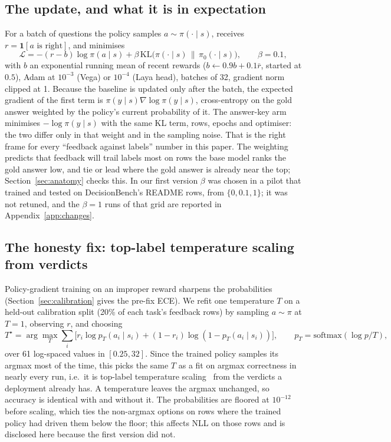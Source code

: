 \documentclass[11pt]{article}
\newcommand{\KL}{\mathrm{KL}}
\begin{document}
\subsection{The update, and what it is in expectation}
For a batch of questions the policy samples $a\sim\pi(\cdot\mid s)$, receives $r=\mathbf 1[a\text{ is right}]$, and minimises
\begin{equation}
\mathcal L = -(r-b)\log\pi(a\mid s) + \beta\,\KL\big(\pi(\cdot\mid s)\,\|\,\pi_0(\cdot\mid s)\big),\qquad \beta=0.1,
\label{eq:loss}
\end{equation}
with $b$ an exponential running mean of recent rewards ($b\leftarrow0.9b+0.1\bar r$, started at $0.5$), Adam at $10^{-3}$ (Vega) or $10^{-4}$ (Laya head), batches of 32, gradient norm clipped at 1. Because the baseline is updated only after the batch, the expected gradient of the first term is $\pi(y\mid s)\nabla\log\pi(y\mid s)$, cross-entropy on the gold answer weighted by the policy's current probability of it. The answer-key arm minimises $-\log\pi(y\mid s)$ with the same KL term, rows, epochs and optimiser: the two differ only in that weight and in the sampling noise. That is the right frame for every ``feedback against labels'' number in this paper. The weighting predicts that feedback will trail labels most on rows the base model ranks the gold answer low, and tie or lead where the gold answer is already near the top; Section~\ref{sec:anatomy} checks this. In our first version $\beta$ was chosen in a pilot that trained and tested on DecisionBench's README rows, from $\{0, 0.1, 1\}$; it was not retuned, and the $\beta=1$ runs of that grid are reported in Appendix~\ref{app:changes}.

\subsection{The honesty fix: top-label temperature scaling from verdicts}
Policy-gradient training on an improper reward sharpens the probabilities (Section~\ref{sec:calibration} gives the pre-fix ECE). We refit one temperature $T$ on a held-out calibration split (20\% of each task's feedback rows) by sampling $a\sim\pi$ at $T=1$, observing $r$, and choosing
\begin{equation}
T^\star=\arg\max_T\sum_i\big[r_i\log p_T(a_i\mid s_i)+(1-r_i)\log(1-p_T(a_i\mid s_i))\big],\qquad p_T=\mathrm{softmax}(\log p/T),
\end{equation}
over 61 log-spaced values in $[0.25, 32]$. Since the trained policy samples its argmax most of the time, this picks the same $T$ as a fit on argmax correctness in nearly every run, i.e.\ it is top-label temperature scaling~\citep{gupta2022toplabel} from the verdicts a deployment already has. A temperature leaves the argmax unchanged, so accuracy is identical with and without it. The probabilities are floored at $10^{-12}$ before scaling, which ties the non-argmax options on rows where the trained policy had driven them below the floor; this affects NLL on those rows and is disclosed here because the first version did not.
\end{document}
